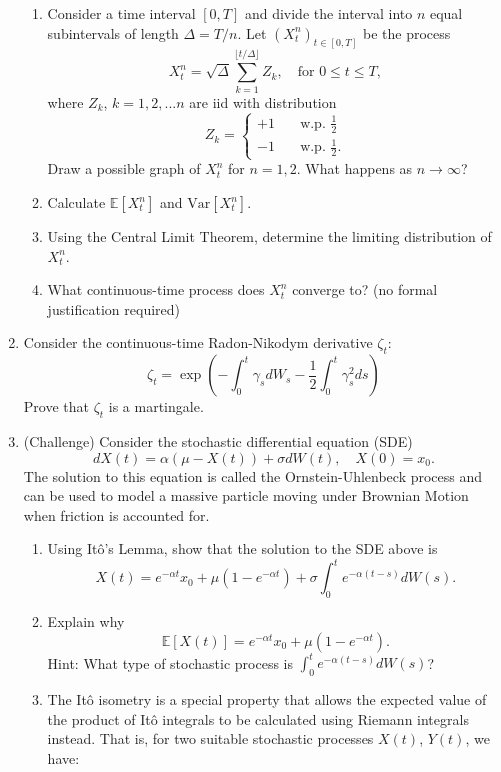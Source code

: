\documentclass[11pt]{article}
\newcommand{\E}{\mathbb{E}}
\begin{document}
\begin{enumerate}
		\begin{enumerate}
			\item Consider a time interval $[0, T]$ and divide the interval into $n$ equal subintervals of length $\Delta = T/n$. Let $(X_t^{n})_{t\in[0,T]}$ be the process
			\[	X_t^{n} = \sqrt{\Delta}\sum_{k=1}^{\lfloor t/\Delta \rfloor}Z_{k}, \quad \text{for } 0\leq t\leq T,
			\]
			where $Z_{k}$, $k=1,2,...n$ are iid with distribution 
			\[	Z_{k} = \begin{cases}
				+1 &  \quad \text{w.p. } \frac{1}{2} \\
				-1 & \quad \text{w.p. } \frac{1}{2}.
			\end{cases}
			\]
			Draw a possible graph of $X^{n}_{t}$ for $n=1,2$. What happens as $n\to\infty$?
			\item Calculate $\E[X^{n}_{t}]$ and $\text{Var}[X^{n}_{t}]$.
			\item Using the Central Limit Theorem, determine the limiting distribution of $X^{n}_{t}$.
			\item What continuous-time process does $X^{n}_{t}$ converge to? (no formal justification required)
		\end{enumerate}
		\item Consider the continuous-time Radon-Nikodym derivative $\zeta_t$:
		\[	\zeta_t = \exp\left(-\int_{0}^{t}\gamma_{s}dW_s -\frac{1}{2} \int_{0}^{t}\gamma_{s}^{2}ds\right)
		\]
		Prove that $\zeta_t$ is a martingale.
		\item (Challenge) Consider the stochastic differential equation (SDE)
		\[	dX(t) = \alpha(\mu - X(t))+ \sigma dW(t),\quad X(0) = x_{0}.
		\]
		The solution to this equation is called the Ornstein-Uhlenbeck process and can be used to model a massive particle moving under Brownian Motion when friction is accounted for.
		\begin{enumerate}
			\item Using It\^{o}'s Lemma, show that the solution to the SDE above 
			is 
			\[	X(t) = e^{-\alpha t}x_{0} + \mu(1 - e^{-\alpha t}) + \sigma\int_{0}^{t}e^{-\alpha(t - s)}dW(s).
			\]
			\item Explain why 
			\[	\E[X(t)] = e^{-\alpha t}x_{0} + \mu(1 - e^{-\alpha t}).
			\]
			Hint: What type of stochastic process is $\int_{0}^{t}e^{-\alpha(t - s)}dW(s)$?
			\item The It\^{o} isometry is a special property that allows the expected value of the product of It\^{o} integrals to be calculated using Riemann integrals instead. That is, for two suitable stochastic processes $X(t)$, $Y(t)$, we have:

\end{enumerate}
\end{enumerate}
\end{document}
